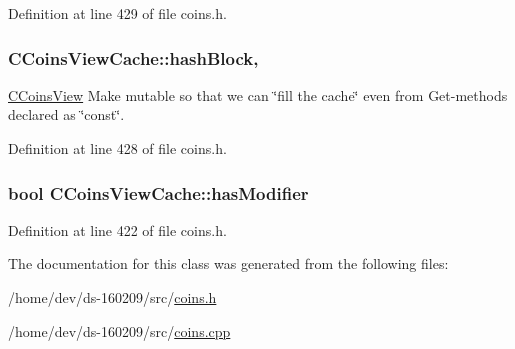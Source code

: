 Definition at line 429 of file coins.\+h.

\hypertarget{class_c_coins_view_cache_a229dddddbc5501edc250209a2ce5df8b}{}
\subsubsection[{hash\+Block}]{ C\+Coins\+View\+Cache\+::hash\+Block\hspace{0.3cm}{\ttfamily [mutable]}, {\ttfamily [protected]}}\label{class_c_coins_view_cache_a229dddddbc5501edc250209a2ce5df8b}
\hyperlink{class_c_coins_view}{C\+Coins\+View} Make mutable so that we can \char`\"{}fill the cache\char`\"{} even from Get-\/methods declared as \char`\"{}const\char`\"{}. 

Definition at line 428 of file coins.\+h.

\hypertarget{class_c_coins_view_cache_a363e27234d36bb0fc533d60cd64d1bc3}{}
\subsubsection[{has\+Modifier}]{\setlength{\rightskip}{0pt plus 5cm}bool C\+Coins\+View\+Cache\+::has\+Modifier\hspace{0.3cm}{\ttfamily [protected]}}\label{class_c_coins_view_cache_a363e27234d36bb0fc533d60cd64d1bc3}


Definition at line 422 of file coins.\+h.



The documentation for this class was generated from the following files\+:\begin{DoxyCompactItemize}
\item 
/home/dev/ds-\/160209/src/\hyperlink{coins_8h}{coins.\+h}\item 
/home/dev/ds-\/160209/src/\hyperlink{coins_8cpp}{coins.\+cpp}\end{DoxyCompactItemize}
